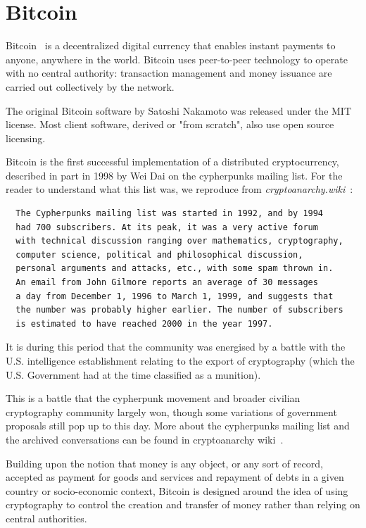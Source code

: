 \section{Bitcoin} \label{sec:Bitcoin}
Bitcoin~\cite{Nakamoto_bitcoin:a} is a decentralized digital currency that enables instant payments to anyone, anywhere in the world. Bitcoin uses peer-to-peer technology to operate with no central authority: transaction management and money issuance are carried out collectively by the network.

The original Bitcoin software by Satoshi Nakamoto was released under the MIT license. Most client software, derived or "from scratch", also use open source licensing.

Bitcoin is the first successful implementation of a distributed cryptocurrency, described in part in 1998 by Wei Dai on the cypherpunks mailing list. For the reader to understand what this list was, we reproduce from \emph{cryptoanarchy.wiki}~\cite{cryptoanarchy}:

\begin{verbatim}
  The Cypherpunks mailing list was started in 1992, and by 1994
  had 700 subscribers. At its peak, it was a very active forum
  with technical discussion ranging over mathematics, cryptography,
  computer science, political and philosophical discussion,
  personal arguments and attacks, etc., with some spam thrown in.
  An email from John Gilmore reports an average of 30 messages
  a day from December 1, 1996 to March 1, 1999, and suggests that
  the number was probably higher earlier. The number of subscribers
  is estimated to have reached 2000 in the year 1997.
\end{verbatim}

It is during this period that the community was energised by a battle with the U.S. intelligence establishment relating to the export of cryptography (which the U.S. Government had at the time classified as a munition).

This is a battle that the cypherpunk movement and broader civilian cryptography community largely won, though some variations of government proposals still pop up to this day. More about the cypherpunks mailing list and the archived conversations can be found in cryptoanarchy wiki~\cite{cryptoanarchy}.

Building upon the notion that money is any object, or any sort of record, accepted as payment for goods and services and repayment of debts in a given country or socio-economic context, Bitcoin is designed around the idea of using cryptography to control the creation and transfer of money rather than relying on central authorities.


